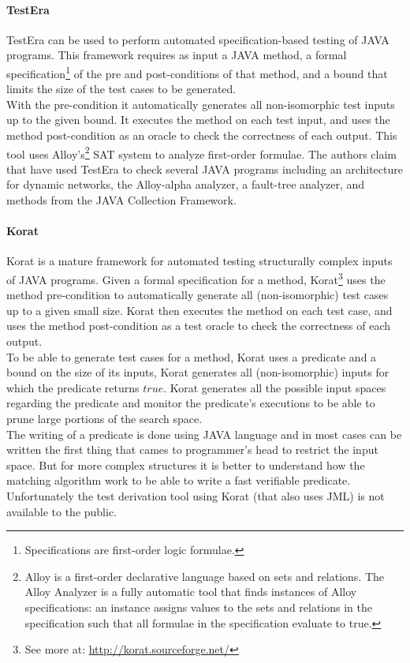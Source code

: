\paragraph{TestEra}
TestEra\cite{testera} can be used to perform automated specification-based testing of
JAVA programs. This framework requires as input a JAVA method, a formal specification\footnote{Specifications are first-order logic formulae.}
of the pre and post-conditions of that method, and a bound that limits the size of the test cases to be generated.\\
With the pre-condition it automatically generates all non-isomorphic test inputs up to the given bound.
It executes the method on each test input, and uses the method post-condition as an oracle to check the correctness of each output. This tool
uses Alloy's\footnote{Alloy is a first-order declarative language based on sets and relations. The Alloy Analyzer is a fully
automatic tool that finds instances of Alloy specifications: an instance
assigns values to the sets and relations in the specification such that
all formulae in the specification evaluate to true.} \ac{SAT} system to analyze first-order  formulae.
The authors claim that have used TestEra to check several JAVA programs including an architecture for
dynamic networks, the Alloy-alpha analyzer, a fault-tree analyzer, and methods from the JAVA Collection Framework.

\paragraph{Korat}
Korat\cite{Boyapati02korat:automated} is a mature framework for automated testing structurally complex inputs of JAVA programs.
Given a formal specification for a method, Korat\footnote{See more at: \url{http://korat.sourceforge.net/}} uses the method pre-condition
to automatically generate all (non-isomorphic) test cases up to a given small size.
Korat then executes the method on each test case, and uses the method post-condition as a test oracle to check the correctness of each output.\\
To be able to generate test cases for a method, Korat uses a predicate and a bound on the size of its inputs,
Korat generates all (non-isomorphic) inputs for which the predicate returns $true$.
Korat generates all the possible input spaces regarding the predicate and monitor the predicate's executions to be able to prune large portions of the search space.\\
\indent The writing of a predicate is done using JAVA language and in most cases can be written the first thing that cames to programmer's head to restrict the input space.
But for more complex structures it is better to understand how the matching algorithm work to be able to write a fast verifiable predicate.\\
Unfortunately the test derivation tool using Korat (that also uses \ac{JML}) is not available to the public.

